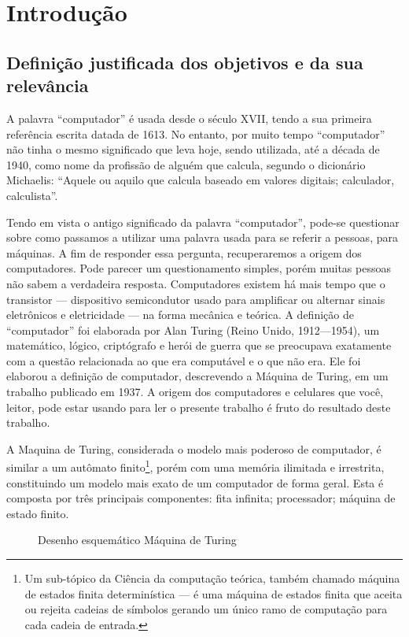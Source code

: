 \section{Introdução} 
\subsection{Definição justificada dos objetivos e da sua relevância}
A palavra ``computador'' é usada desde o século XVII, tendo a sua primeira referência escrita datada de 1613. No entanto, por muito tempo ``computador'' não tinha o mesmo significado que leva hoje, sendo utilizada, até a década de 1940, como nome da profissão de alguém que calcula, segundo o dicionário Michaelis: “Aquele ou aquilo que calcula baseado em valores digitais; calculador, calculista”. \cite{4}

Tendo em vista o antigo significado da palavra ``computador'', pode-se questionar sobre como passamos a utilizar uma palavra usada para se referir a pessoas, para máquinas. A fim de responder essa pergunta, recuperaremos a origem dos computadores. Pode parecer um questionamento simples, porém muitas pessoas não sabem a verdadeira resposta. Computadores existem há mais tempo que o transistor — dispositivo semicondutor usado para amplificar ou alternar sinais eletrônicos e eletricidade — na forma mecânica e teórica. A definição de ``computador'' foi elaborada por Alan Turing (Reino Unido, 1912—1954), um matemático, lógico, criptógrafo e herói de guerra que se preocupava exatamente com a questão relacionada ao que era computável e o que não era. Ele foi elaborou a definição de computador, descrevendo a Máquina de Turing, em um trabalho publicado em 1937. A origem dos computadores e celulares que você, leitor, pode estar usando para ler o presente trabalho é fruto do resultado deste trabalho.

A Maquina de Turing, considerada o modelo mais poderoso de computador, é similar a um autômato finito\footnote{Um sub-tópico da Ciência da computação teórica, também chamado máquina de estados finita determinística — é uma máquina de estados finita que aceita ou rejeita cadeias de símbolos gerando um único ramo de computação para cada cadeia de entrada.}, porém com uma memória ilimitada e irrestrita, constituindo um modelo mais exato de um computador de forma geral. Esta é composta por três principais componentes: fita infinita; processador; máquina de estado finito.

\vspace{1cm}
\begin{figure}[H] \centering 
  \caption{\label{fig:1} Desenho esquemático Máquina de Turing} 
\end{figure}

